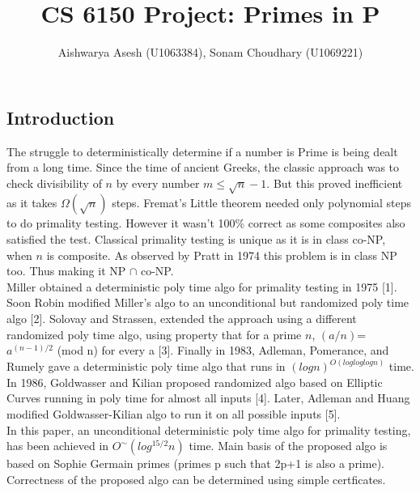 \documentclass[10pt]{article}
\title{{\Large CS 6150 Project: Primes in P}}
\author{Aishwarya Asesh (U1063384), Sonam Choudhary (U1069221)}
\date{}
\begin{document}
\maketitle
\subsection*{Introduction}
\hspace*{0.8cm}The struggle to deterministically determine if a number is Prime is being dealt from a long time. Since the time of ancient Greeks, the classic approach was to check divisibility of $n$ by every number $m \leq \sqrt{n} - 1$. But this proved inefficient as it takes $\Omega (\sqrt {n})$ steps. Fremat's Little theorem needed only polynomial steps to do primality testing. However it wasn't 100\% correct as some composites also satisfied the test. Classical primality testing is unique as it is in class co-NP, when $n$ is composite. As observed by Pratt in 1974 this problem is in class NP too. Thus making it NP $\cap$ co-NP.\\
\hspace*{0.8cm}Miller obtained a deterministic poly time algo for primality testing in 1975 [1]. Soon Robin modified Miller's algo to an unconditional but randomized poly time algo [2]. Solovay and Strassen, extended the approach using a different randomized poly time algo, using  property that for a prime $n$, $({a}/{n})$= $a^{{(n-1)}/{2}}$ (mod n) for every a [3]. Finally in 1983, Adleman, Pomerance, and Rumely gave a deterministic poly time algo that runs in $(log n)^{O(log log log n)}$ time. In 1986, Goldwasser and Kilian proposed randomized algo based on Elliptic Curves running in poly time for almost all inputs [4]. Later, Adleman and Huang modified Goldwasser-Kilian algo to run it on all possible inputs [5].\\
\hspace*{0.8cm}In this paper, an unconditional deterministic poly time algo for primality testing, has been achieved in $O^{\sim}(log^{15/2}n)$ time. Main basis of the proposed algo is based on Sophie Germain primes (primes p such that 2p+1 is also a prime). Correctness of the proposed algo can be determined using simple certficates.
\end{document}
